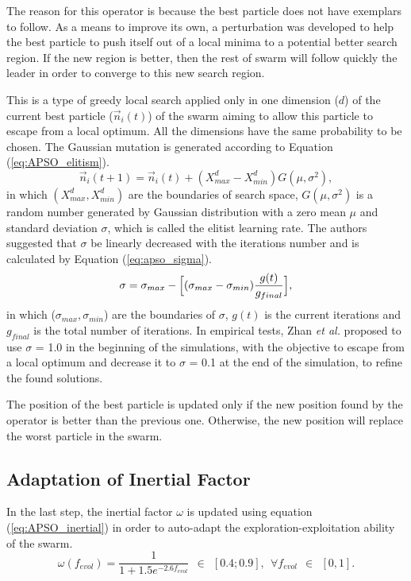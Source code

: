 The reason for this operator is because the best particle does not have exemplars to follow. As a means to improve its own, a perturbation was developed to help the best particle to push itself out of a local minima to a potential better search region. If the new region is better, then the rest of swarm will follow quickly the leader in order to converge to this new search region.

This is a type of greedy local search applied only in one dimension ($d$) of the current best particle ($\vec n_i (t)$) of the swarm aiming to allow this particle to escape from a local optimum. All the dimensions have the same probability to be chosen. The Gaussian mutation is generated according to Equation (\ref{eq:APSO_elitism}).
\begin{equation} \label{eq:APSO_elitism}
\vec n_i(t+1) = \vec n_i(t) + (X_{max}^d - X_{min}^d)G(\mu,\sigma^2),
\end{equation}
in which $(X_{max}^d, X_{min}^d)$ are the boundaries of search space, $G(\mu,\sigma^2)$ is a random number generated by Gaussian distribution with a zero mean $\mu$ and standard deviation $\sigma$, which is called the elitist learning rate. The authors suggested that $\sigma$ be linearly decreased with the iterations number and is calculated by Equation (\ref{eq:apso_sigma}).
\begin{equation} \label{eq:apso_sigma}
\sigma = \sigma_{max} - \Bigl[(\sigma_{max} - \sigma_{min})\frac{g(t)}{g_{final}}\Bigr],
\end{equation}
in which ($\sigma_{max},\sigma_{min}$) are the boundaries of $\sigma$, $g(t)$ is the current iterations and $g_{final}$ is the total number of iterations. In empirical tests, Zhan \emph{et al.} proposed to use $\sigma$ = 1.0 in the beginning of the simulations, with the objective to escape from a local optimum and decrease it to $\sigma$ = 0.1 at the end of the simulation, to refine the found solutions.

The position of the best particle is updated only if the new position found by the operator is better than the previous one. Otherwise, the new position will replace the worst particle in the swarm.

\subsection{Adaptation of Inertial Factor}
In the last step, the inertial factor $\omega$ is updated using equation (\ref{eq:APSO_inertial}) in order to auto-adapt the exploration-exploitation ability of the swarm.
\begin{equation}\label{eq:APSO_inertial}
\omega(f_{evol}) = \frac{1}{1 + 1.5e^{-2.6f_{evol}}} \ \ \in \ \ [0.4;0.9], \ \ \forall f_{evol} \ \ \in \ \ [0,1].
\end{equation}

